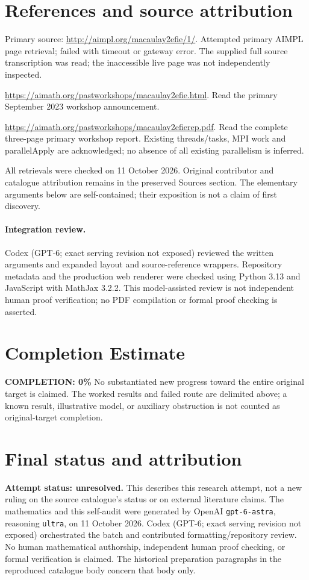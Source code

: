 \documentclass[11pt]{article}
\begin{document}
\section{References and source attribution}
Primary source: \url{http://aimpl.org/macaulay2efie/1/}. Attempted primary AIMPL page retrieval; failed with timeout or gateway error. The supplied full source transcription was read; the inaccessible live page was not independently inspected.

\url{https://aimath.org/pastworkshops/macaulay2efie.html}. Read the primary September 2023 workshop announcement.

\url{https://aimath.org/pastworkshops/macaulay2efierep.pdf}. Read the complete three-page primary workshop report. Existing threads/tasks, MPI work and parallelApply are acknowledged; no absence of all existing parallelism is inferred.

All retrievals were checked on 11 October 2026. Original contributor and catalogue attribution remains in the preserved Sources section. The elementary arguments below are self-contained; their exposition is not a claim of first discovery.


\paragraph{Integration review.} Codex (GPT-6; exact serving revision not exposed) reviewed the written arguments and expanded layout and source-reference wrappers. Repository metadata and the production web renderer were checked using Python 3.13 and JavaScript with MathJax 3.2.2. This model-assisted review is not independent human proof verification; no PDF compilation or formal proof checking is asserted.

\section{Completion Estimate}
\noindent\textbf{COMPLETION: 0\%}
No substantiated new progress toward the entire original target is claimed. The worked results and failed route are delimited above; a known result, illustrative model, or auxiliary obstruction is not counted as original-target completion.

\section{Final status and attribution}
\textbf{Attempt status: unresolved.} This describes this research attempt, not a new ruling on the source catalogue's status or on external literature claims.
The mathematics and this self-audit were generated by OpenAI \texttt{gpt-6-astra}, reasoning \texttt{ultra}, on 11 October 2026. Codex (GPT-6; exact serving revision not exposed) orchestrated the batch and contributed formatting/repository review. No human mathematical authorship, independent human proof checking, or formal verification is claimed. The historical preparation paragraphs in the reproduced catalogue body concern that body only.
\end{document}
